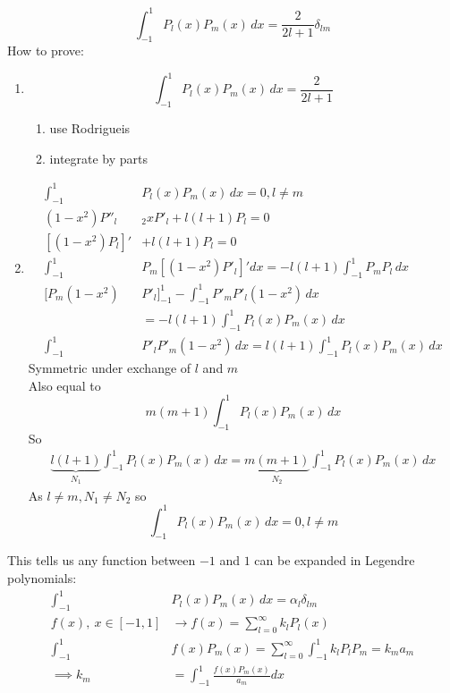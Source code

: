 \documentclass[Maths.tex]{subfiles}
\begin{document}
\begin{equation*}
    \int_{-1}^1 P_l(x)P_m(x)\,dx = \frac{2}{2l+1}\delta_{lm}
\end{equation*}
How to prove:
\begin{enumerate}
    \item
    \begin{equation*}
        \int_{-1}^1 P_l(x)P_m(x)\,dx = \frac{2}{2l+1}
    \end{equation*}
    \begin{enumerate}
        \item use Rodrigueis
        \item integrate by parts
    \end{enumerate}
    \item
    \begin{align*}
        \int_{-1}^1 &P_l(x)P_m(x)\,dx = 0, l\neq m \\
        (1-x^2)P''_l &_ 2xP'_l + l(l+1)P_l = 0 \\
        [(1-x^2)P_l]' &+ l(l+1)P_l = 0 \\
        \int_{-1}^1 &P_m[(1-x^2)P'_l]'dx = -l(l+1)\int_{-1}^1 P_mP_l\,dx \\
        [P_m(1-x^2)&P'_l]_{-1}^1 - \int_{-1}^1 P'_mP'_l(1-x^2)\,dx \\
        &= -l(l+1)\int_{-1}^1 P_l(x)P_m(x)\,dx \\
        \int_{-1}^1 &P'_lP'_m(1-x^2)\,dx = l(l+1)\int_{-1}^1 P_l(x)P_m(x)\,dx
    \end{align*}
    Symmetric under exchange of $l$ and $m$ \\
    Also equal to
    \begin{equation*}
        m(m+1)\int_{-1}^1 P_l(x)P_m(x)\,dx
    \end{equation*}
    So
    \begin{align*}
        \underbrace{l(l+1)}_{N_1}\int_{-1}^1 P_l(x)P_m(x)\,dx = \underbrace{m(m+1)}_{N_2}\int_{-1}^1 P_l(x)P_m(x)\,dx
    \end{align*}
    As $l\neq m, N_1 \neq N_2$ so
    \begin{equation*}
        \int_{-1}^1 P_l(x)P_m(x)\,dx = 0, l\neq m
    \end{equation*}
\end{enumerate}
This tells us any function between $-1$ and $1$ can be expanded in Legendre polynomials:
\begin{align*}
    \int_{-1}^1 &P_l(x)P_m(x)\,dx = \alpha_l \delta_{lm} \\
    f(x),~ x\in [-1,1] &\to f(x) = \sum_{l=0}^\infty k_lP_l(x) \\
    \int_{-1}^1 &f(x)P_m(x) = \sum_{l=0}^\infty \int_{-1}^1 k_lP_lP_m = k_ma_m \\
    \implies k_m &= \int_{-1}^1 \frac{f(x)P_m(x)}{a_m}dx
\end{align*}
\end{document}
